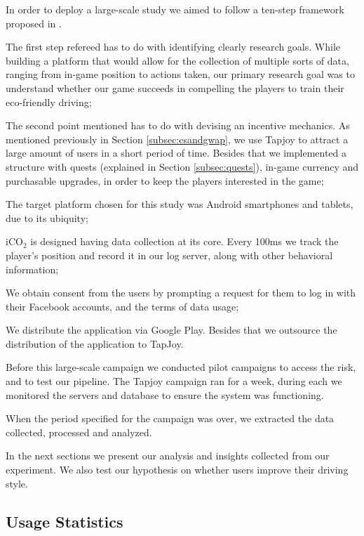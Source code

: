 \documentclass[preprint,authoryear,12pt]{elsarticle}
\begin{document}
In order to deploy a large-scale study we aimed to follow a ten-step framework proposed in \citep{Henze2013}. 
\begin{inparaenum}[\itshape 1\upshape)]
	\item The first step refereed has to do with identifying clearly research goals. While building a platform that would allow for the collection of multiple sorts of data, ranging from in-game position to actions taken, our primary research goal was to understand whether our game succeeds in compelling the players to train their eco-friendly driving;
	\item The second point mentioned has to do with devising an incentive mechanics. As mentioned previously in Section \ref{subsec:csandgwap}, we use Tapjoy to attract a large amount of users in a short period of time. Besides that we implemented a structure with quests (explained in Section \ref{subsec:quests}), in-game currency and purchasable upgrades, in order to keep the players interested in the game;
	\item The target platform chosen for this study was Android smartphones and tablets, due to its ubiquity;
	\item iCO$_2$ is designed having data collection at its core. Every 100ms we track the player's position and record it in our log server, along with other behavioral information;
	\item We obtain consent from the users by prompting a request for them to log in with their Facebook accounts, and the terms of data usage;
	\item We distribute the application via Google Play. Besides that we outsource the distribution of the application to TapJoy. 
	\item Before this large-scale campaign we conducted pilot campaigns to access the risk, and to test our pipeline. The Tapjoy campaign ran for a week, during each we monitored the servers and database to ensure the system was functioning.
	\item When the period specified for the campaign was over, we extracted the data collected, processed and analyzed. 
\end{inparaenum}

In the next sections we present our analysis and insights collected from our  experiment. We also test our hypothesis on whether users improve their driving style. 


\subsection{Usage Statistics}
\label{subsec:usage_stats}
\end{document}
